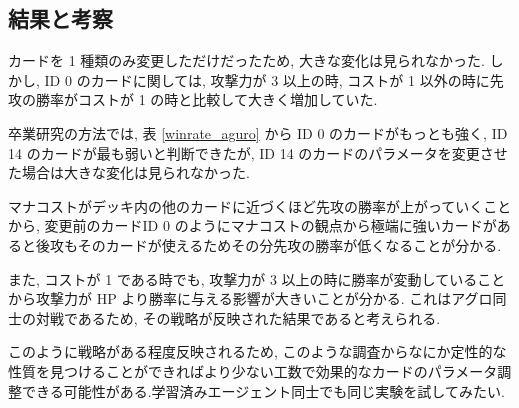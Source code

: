 \documentclass{jarticle}     %
\begin{document}
  \subsection{結果と考察}
  カードを 1 種類のみ変更しただけだったため, 大きな変化は見られなかった. 
  しかし, ID 0 のカードに関しては, 攻撃力が 3 以上の時, コストが 1 以外の時に先攻の勝率がコストが 1 の時と比較して大きく増加していた.\par
  卒業研究の方法では, 表 \ref{winrate_aguro} から ID 0 のカードがもっとも強く, ID 14 のカードが最も弱いと判断できたが, ID 14 のカードのパラメータを変更させた場合は大きな変化は見られなかった.\par
  マナコストがデッキ内の他のカードに近づくほど先攻の勝率が上がっていくことから, 変更前のカードID 0 のようにマナコストの観点から極端に強いカードがあると後攻もそのカードが使えるためその分先攻の勝率が低くなることが分かる.\par
  また, コストが 1 である時でも, 攻撃力が 3 以上の時に勝率が変動していることから攻撃力が HP より勝率に与える影響が大きいことが分かる. これはアグロ同士の対戦であるため, その戦略が反映された結果であると考えられる. \par
  このように戦略がある程度反映されるため, このような調査からなにか定性的な性質を見つけることができればより少ない工数で効果的なカードのパラメータ調整できる可能性がある.学習済みエージェント同士でも同じ実験を試してみたい.
\end{document}

